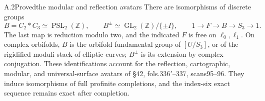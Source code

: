 \begin{claim}{A.2}{Proved}{the modular and reflection avatars}
There are isomorphisms of discrete groups
\[
 B=C_2*C_3\simeq\operatorname{PSL}_2(\mathbb Z),\qquad
 B^\pm\simeq\operatorname{GL}_2(\mathbb Z)/\{\pm I\},
 \qquad
 1\longrightarrow F\longrightarrow B\longrightarrow S_3\longrightarrow1.
\]
The last map is reduction modulo two, and the indicated $F$ is free on $\ell_0,\ell_1$. On complex orbifolds, $B$ is the orbifold fundamental group of $[U/S_3]$, or of the rigidified moduli stack of elliptic curves; $B^\pm$ is its extension by complex conjugation. These identifications account for the reflection, cartographic, modular, and universal-surface avatars of \S42, fols.336$'$--337, scans95--96. They induce isomorphisms of full profinite completions, and the index-six exact sequence remains exact after completion.

\end{claim}
